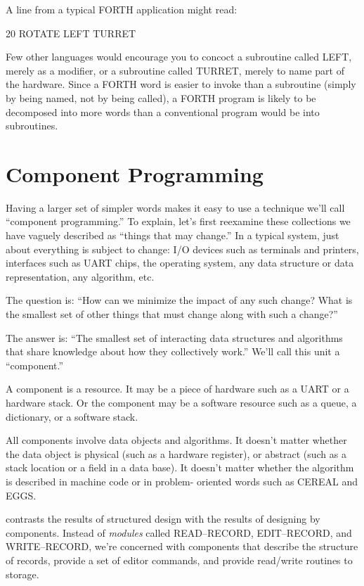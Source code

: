 A line from a typical FORTH application might read:

\begin{Code}
20 ROTATE LEFT TURRET
\end{Code}
Few other languages would encourage you to concoct a subroutine called
LEFT, merely as a modifier, or a subroutine called TURRET, merely
to name part of the hardware. Since a FORTH word is easier to invoke
than a subroutine (simply by being named, not by being called), a
FORTH program is likely to be decomposed into more words than a conventional
program would be into subroutines.


\section{Component Programming}
Having a larger set of simpler words makes it easy to use a technique
we'll call ``component programming.'' To explain, let's first reexamine
these collections we have vaguely described as ``things that may change.''
In a typical system, just about everything is subject to change: I/O
devices such as terminals and printers, interfaces such as UART chips,
the operating system, any data structure or data representation, any
algorithm, etc.

The question is: ``How can we minimize the impact of any such change?
What is the smallest set of other things that must change along with
such a change?''

The answer is: ``The smallest set of interacting data structures and
algorithms that share knowledge about how they collectively work.''
We'll call this unit a ``component.''

A component is a resource. It may be a piece of hardware such as a
UART or a hardware stack. Or the component may be a software resource
such as a queue, a dictionary, or a software stack.

All components involve data objects and algorithms. It doesn't matter
whether the data object is physical (such as a hardware register),
or abstract (such as a stack location or a field in a data base).
It doesn't matter whether the algorithm is described in machine code
or in problem- oriented words such as CEREAL and EGGS.

 contrasts the results of structured design with the results
of designing by components. Instead of \emph{modules} called READ--RECORD,
EDIT--RECORD, and WRITE--RECORD, we're concerned with components
that describe the structure of records, provide a set of editor commands,
and provide read/write routines to storage.

